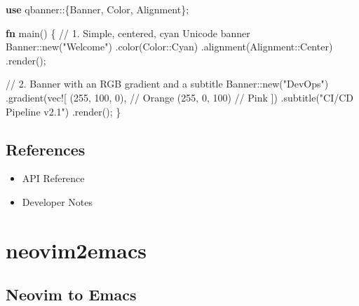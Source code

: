 \documentclass[
  letterpaper,
  DIV=11,
  numbers=noendperiod]{scrreprt}
\newenvironment{Shaded}{\begin{snugshade}}{\end{snugshade}}
\newcommand{\CommentTok}[1]{\textcolor[rgb]{0.37,0.37,0.37}{#1}}
\newcommand{\DecValTok}[1]{\textcolor[rgb]{0.68,0.00,0.00}{#1}}
\newcommand{\KeywordTok}[1]{\textcolor[rgb]{0.00,0.23,0.31}{\textbf{#1}}}
\newcommand{\NormalTok}[1]{\textcolor[rgb]{0.00,0.23,0.31}{#1}}
\newcommand{\OperatorTok}[1]{\textcolor[rgb]{0.37,0.37,0.37}{#1}}
\newcommand{\PreprocessorTok}[1]{\textcolor[rgb]{0.68,0.00,0.00}{#1}}
\newcommand{\StringTok}[1]{\textcolor[rgb]{0.13,0.47,0.30}{#1}}
\begin{document}
\begin{Shaded}
\begin{Highlighting}[]
\KeywordTok{use} \PreprocessorTok{qbanner::}\OperatorTok{\{}\NormalTok{Banner}\OperatorTok{,}\NormalTok{ Color}\OperatorTok{,}\NormalTok{ Alignment}\OperatorTok{\};}

\KeywordTok{fn}\NormalTok{ main() }\OperatorTok{\{}
    \CommentTok{// 1. Simple, centered, cyan Unicode banner}
    \PreprocessorTok{Banner::}\NormalTok{new(}\StringTok{"Welcome"}\NormalTok{)}
        \OperatorTok{.}\NormalTok{color(}\PreprocessorTok{Color::}\NormalTok{Cyan)}
        \OperatorTok{.}\NormalTok{alignment(}\PreprocessorTok{Alignment::}\NormalTok{Center)}
        \OperatorTok{.}\NormalTok{render()}\OperatorTok{;}

    \CommentTok{// 2. Banner with an RGB gradient and a subtitle}
    \PreprocessorTok{Banner::}\NormalTok{new(}\StringTok{"DevOps"}\NormalTok{)}
        \OperatorTok{.}\NormalTok{gradient(}\PreprocessorTok{vec!}\NormalTok{[}
\NormalTok{            (}\DecValTok{255}\OperatorTok{,} \DecValTok{100}\OperatorTok{,} \DecValTok{0}\NormalTok{)}\OperatorTok{,} \CommentTok{// Orange}
\NormalTok{            (}\DecValTok{255}\OperatorTok{,} \DecValTok{0}\OperatorTok{,} \DecValTok{100}\NormalTok{)  }\CommentTok{// Pink}
\NormalTok{        ])}
        \OperatorTok{.}\NormalTok{subtitle(}\StringTok{"CI/CD Pipeline v2.1"}\NormalTok{)}
        \OperatorTok{.}\NormalTok{render()}\OperatorTok{;}
\OperatorTok{\}}
\end{Highlighting}
\end{Shaded}

\chapter{References}\label{references}

\begin{itemize}
\item
  API Reference
\item
  Developer Notes
\end{itemize}

\part{neovim2emacs}

\chapter{Neovim to Emacs}\label{neovim-to-emacs}
\end{document}
